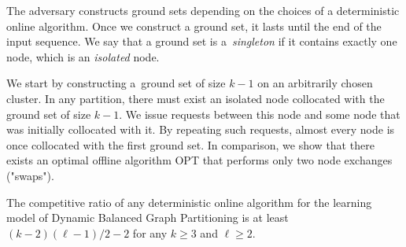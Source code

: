 \documentclass[a4paper,anonymous,USenglish]{lipics-v2019}
\newcommand{\OPT}{\textsc{OPT}\xspace}
\begin{document}
The adversary constructs ground sets depending on the choices of a deterministic online algorithm.
Once we construct a ground set, it lasts until the end of the input sequence.
We say that a ground set is a~\emph{singleton} if it contains exactly one node,
which is an \emph{isolated} node.


We start by constructing a~ground set of size $k-1$ on an arbitrarily chosen cluster.
In any partition, there must exist an isolated node collocated with the ground set of size $k-1$.
We issue requests between this node and some node that was initially collocated with it.
By repeating such requests, almost every node is once collocated with the first ground set.
In comparison, we show that there exists an optimal offline algorithm \OPT that performs only two node exchanges ("swaps").


\begin{theorem}
	\label{th:lowerbound}
	The competitive ratio of any deterministic online algorithm for the learning model of Dynamic Balanced Graph Partitioning is at least
	 $(k-2)(\ell-1)/2 - 2$ for any $k\geq 3$ and $\ell \geq 2$.
\end{theorem}
\end{document}

